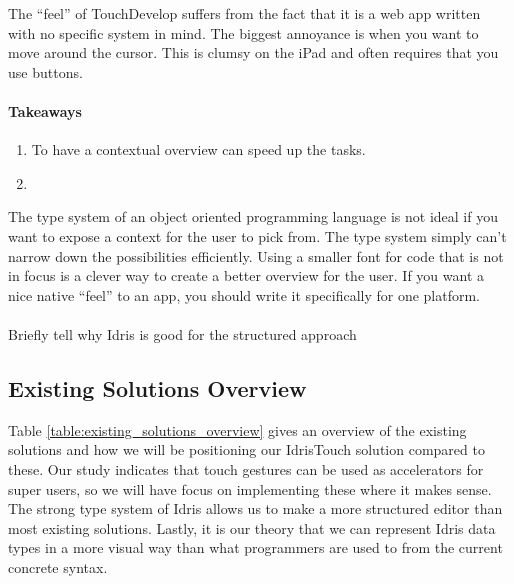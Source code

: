 The “feel” of TouchDevelop suffers from the fact that it is a web app written with no specific system in mind. The biggest annoyance is when you want to move around the cursor. This is clumsy on the iPad and often requires that you use buttons.

\paragraph{Takeaways}
\begin{enumerate}
	\item To have a contextual overview can speed up the tasks.
	\item 
\end{enumerate}

The type system of an object oriented programming language is not ideal if you want to expose a context for the user to pick from. The type system simply can’t narrow down the possibilities efficiently.
Using a smaller font for code that is not in focus is a clever way to create a better overview for the user.
If you want a nice native “feel” to an app, you should write it specifically for one platform.

\paragraph{}

Briefly tell why Idris is good for the structured approach


\subsection{Existing Solutions Overview}
Table \ref{table:existing_solutions_overview} gives an overview of the existing solutions and how we will be positioning our IdrisTouch solution compared to these. Our study indicates that touch gestures can be used as accelerators for super users, so we will have focus on implementing these where it makes sense. The strong type system of Idris allows us to make a more structured editor than most existing solutions. Lastly, it is our theory that we can represent Idris data types in a more visual way than what programmers are used to from the current concrete syntax.
	
